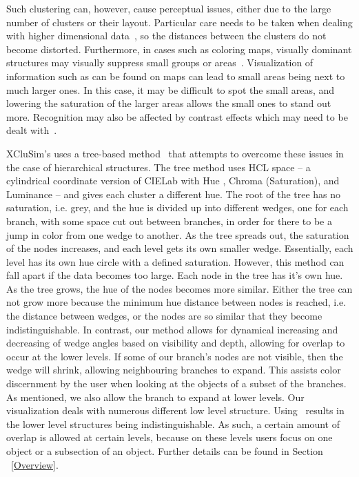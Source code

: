 \documentclass[review,journal]{vgtc}         %
\begin{document}
Such clustering can, however, cause perceptual issues, either due to the large number of clusters or their layout. 
Particular care needs to be taken when dealing with higher dimensional data~\cite{mittelstiidt2014revisiting}, so the distances between the clusters do not become distorted. 
Furthermore, in cases such as coloring maps, visually dominant structures may visually suppress small groups or areas~\cite{lee2013perceptually}.
Visualization of information such as can be found on maps can lead to small areas being next to much larger ones. 
In this case, it may be difficult to spot the small areas, and lowering the saturation of the larger areas allows the small ones to stand out more.
Recognition may also be affected by contrast effects which may need to be dealt with~\cite{mittelstadt2014methods}. 


XCluSim’s uses a tree-based method~\cite{tennekes2014tree} that attempts to overcome these issues in the case of hierarchical structures. 
The tree method uses HCL space – a cylindrical coordinate version of CIELab with Hue , Chroma (Saturation), and Luminance – and gives each cluster a different hue. 
The root of the tree has no saturation, i.e. grey, and the hue is divided up into different wedges, one for each branch, with some space cut out between branches, in order for there to be a jump in color from one wedge to another. 
As the tree spreads out, the saturation of the nodes increases, and each level gets its own smaller wedge. 
Essentially, each level has its own hue circle with a defined saturation. 
However, this method can fall apart if the data becomes too large. Each node in the tree has it's own hue. 
As the tree grows, the hue of the nodes becomes more similar. 
Either the tree can not grow more because the minimum hue distance between nodes is reached, i.e. the distance between wedges, or the nodes are so similar that they become indistinguishable. 
In contrast, our method allows for dynamical increasing and decreasing of wedge angles based on visibility and depth, allowing for overlap to occur at the lower levels. 
If some of our branch's nodes are not visible, then the wedge will shrink, allowing neighbouring branches to expand. 
This assists color discernment by the user when looking at the objects of a subset of the branches.
As mentioned, we also allow the branch to expand at lower levels.
Our visualization deals with numerous different low level structure. 
Using~\cite{tennekes2014tree} results in the lower level structures being indistinguishable. 
As such, a certain amount of overlap is allowed at certain levels, because on these levels users focus on one object or a subsection of an object.
Further details can be found in Section ~\ref{Overview}.
\end{document}

